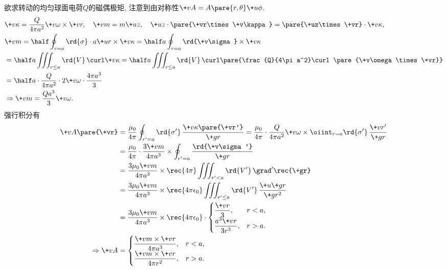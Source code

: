 \documentclass[hidelinks]{ctexart}
\begin{document}
\begin{sample}
    \begin{ex}
        欲求转动的均匀球面电荷$Q$的磁偶极矩, 注意到由对称性$\+vA = A\pare{r,\theta}\+u\phi$.
        \begin{align*}
            & \+v\kappa = \frac{Q}{4\pi a^2} \+v\omega \times \+vr,\quad \+vm = m\+uz,\quad \+uz\cdot\pare{\+vr\times \+v\kappa} = \pare{\+uz\times \+vr}\cdot \+v\kappa, \\
            & \+vm = \half \oint_{r=a} \rd{\sigma}\cdot a\+ur\times \+v\kappa = \half a \oint_{r=a} \rd{\+v\sigma}\times \+v\kappa \\
            & = \half a \iiint_{r\le a} \rd{V}\,\curl \+v\kappa = \half a\iiint_{r\le a}\rd{V}\,\curl\pare{\frac{Q}{4\pi a^2}\curl \pare{\+v\omega \times \+vr}} \\
            &= \half a\cdot \frac{Q}{4\pi a^2}\cdot 2\+v\omega \cdot \frac{4\pi a^3}{3} \\
            & \Rightarrow  \+vm = \frac{Qa^3}{3}\+v\omega.
        \end{align*}
        强行积分有
        \begin{align*}
            \+vA\pare{\+vr} &= \frac{\mu_0}{4\pi} \oint_{r'=a}\rd{\sigma'}\, \frac{\+v\kappa\pare{\+vr'}}{\+gr} = \frac{\mu_0}{4\pi} \cdot \frac{Q}{4\pi a^2} \+v\omega \times \oiint_{r=a}\rd{\sigma'}\, \frac{\+vr'}{\+gr} \\
            &= \frac{\mu_0}{4\pi}\cdot \frac{3\+vm}{4\pi a^3}\times \oint_{r'=a} \frac{\rd{\+v\sigma'}}{\+gr} \\
            &= \frac{3\mu_0 \+vm}{4\pi a^3}\times \rec{4\pi} \iiint_{r'<a}\rd{V'}\, \grad' \rec{\+gr} \\
            &= \frac{3\mu_0 \+vm}{4\pi a^3}\times \rec{4\pi \epsilon_0} \iiint_{r'\le a}\rd{V'}\, \frac{\+u{\+gr}}{\+gr^2} \\
            &= \frac{3\mu_0 \+vm}{4\pi a^3}\times \rec{4\pi \epsilon_0} \cdot \begin{cases}
                \displaystyle \frac{\+vr}{3}, & r<a, \\
                \displaystyle \frac{a^3 \+vr}{3r^3}, & r>a.
            \end{cases} \\
            \Rightarrow  \+vA &= \begin{cases}
                \displaystyle \frac{\+vm\times \+vr}{4\pi a^3}, & r<a, \\
                \displaystyle \frac{\+vm\times \+vr}{4\pi r^2}, & r>a.
            \end{cases}

\end{align*}
\end{ex}
\end{sample}
\end{document}
